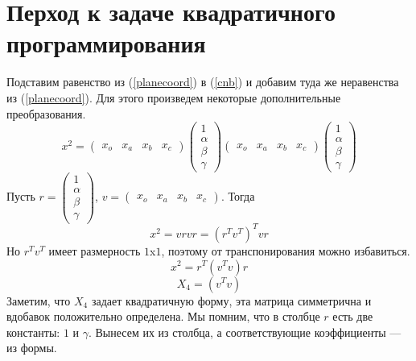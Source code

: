 \documentclass[pdftex,ptm,12pt,a4paper]{report}
\begin{document}
\section{Перход к задаче квадратичного программирования}
    Подставим равенство из (\ref{planecoord}) в (\ref{cnb}) и добавим туда же неравенства из (\ref{planecoord}).
    Для этого произведем некоторые дополнительные преобразования.
    \[
      x^2 = \begin{pmatrix} x_o & x_a & x_b & x_c \end{pmatrix}
             \begin{pmatrix} 1 \\ \alpha \\ \beta \\ \gamma \end{pmatrix}
             \begin{pmatrix} x_o & x_a & x_b & x_c \end{pmatrix}
             \begin{pmatrix} 1 \\ \alpha \\ \beta \\ \gamma \end{pmatrix}
    \]
    Пусть $r = \begin{pmatrix} 1 \\ \alpha \\ \beta \\ \gamma \end{pmatrix} $,
          $v = \begin{pmatrix} x_o & x_a & x_b & x_c \end{pmatrix}$.
    Тогда
    \[
      x^2 = v r v r = (r^T v^T)^T v r
    \]
    Но $r^T v^T$ имеет размерность $1$x$1$, поэтому от транспонирования можно избавиться.
    \[
      x^2 = r^T (v^T v) r
    \]\[
      X_4 = (v^T v)
    \]
    Заметим, что $X_4$ задает квадратичную форму, эта матрица симметрична и вдобавок положительно определена.
    Мы помним, что в столбце $r$ есть две константы: $1$ и $\gamma$.
    Вынесем их из столбца, а соответствующие коэффициенты --- из формы.
\end{document}
